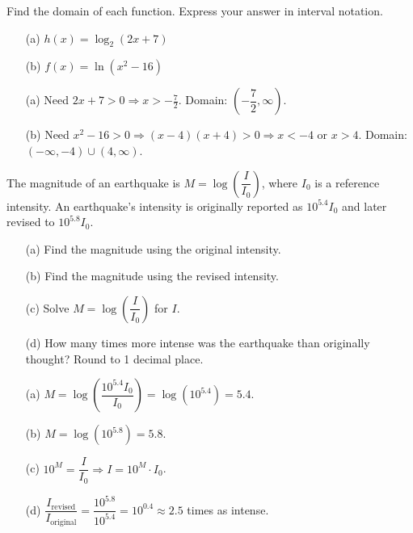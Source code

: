 \documentclass{ximera}
\begin{document}
\begin{problem}
\begin{solution}
\begin{enumerate}
\end{enumerate}
\end{solution}
\end{problem}


\begin{problem}
Find the domain of each function. Express your answer in interval notation.
\begin{enumerate}
  \item[(a)] $h(x) = \log_2(2x+7)$
  \medskip
  \item[(b)] $f(x) = \ln(x^2-16)$
\end{enumerate}

\begin{solution}
\begin{enumerate}
  \item[(a)] Need $2x+7>0 \Rightarrow x>-\tfrac{7}{2}$. Domain: $\left(-\dfrac{7}{2},\infty\right)$.
  \item[(b)] Need $x^2-16>0 \Rightarrow (x-4)(x+4)>0 \Rightarrow x<-4$ or $x>4$. Domain: $(-\infty,-4)\cup(4,\infty)$.
\end{enumerate}
\end{solution}
\end{problem}


\begin{problem}
The magnitude of an earthquake is $M = \log\!\left(\dfrac{I}{I_0}\right)$, where $I_0$ is a reference intensity. An earthquake's intensity is originally reported as $10^{5.4}I_0$ and later revised to $10^{5.8}I_0$.
\begin{enumerate}
  \item[(a)] Find the magnitude using the original intensity.
  \item[(b)] Find the magnitude using the revised intensity.
  \item[(c)] Solve $M = \log\!\left(\dfrac{I}{I_0}\right)$ for $I$.
  \item[(d)] How many times more intense was the earthquake than originally thought? Round to 1 decimal place.
\end{enumerate}

\begin{solution}
\begin{enumerate}
  \item[(a)] $M = \log\!\left(\dfrac{10^{5.4}I_0}{I_0}\right) = \log(10^{5.4}) = 5.4$.
  \item[(b)] $M = \log(10^{5.8}) = 5.8$.
  \item[(c)] $10^M = \dfrac{I}{I_0} \Rightarrow I = 10^M\cdot I_0$.
  \item[(d)] $\dfrac{I_{\text{revised}}}{I_{\text{original}}} = \dfrac{10^{5.8}}{10^{5.4}} = 10^{0.4} \approx \mathbf{2.5}$ times as intense.
\end{enumerate}
\end{solution}
\end{problem}
\end{document}
